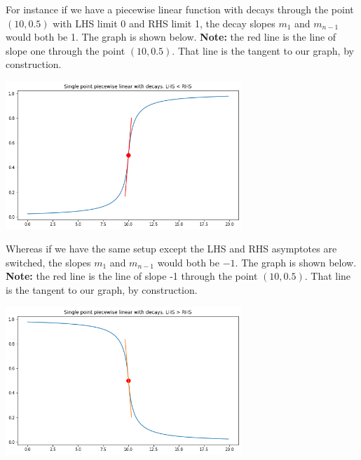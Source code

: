 \documentclass[10pt]{article}
\begin{document}
For instance if we have a piecewise linear function with decays 
through the point $(10,0.5)$ with LHS limit 0 and RHS limit 1, the decay slopes
$m_1$ and $m_{n-1}$ would both be 1.  The graph is shown below. 
\textbf{Note:} the red line is the line of slope one through the point $(10,0.5)$.
That line is the tangent to our graph, by construction. 
\begin{center}
	\includegraphics[width=3.5in]{graph4}
\end{center}

Whereas if we have the same setup except the LHS and RHS asymptotes are switched, the
slopes $m_1$ and $m_{n-1}$ would both be $-1$.  The graph is shown below. 
\textbf{Note:} the red line is the line of slope -1 through the point $(10,0.5)$.
That line is the tangent to our graph, by construction.

\begin{center}
	\includegraphics[width=3.5in]{graph5}
\end{center}
%
%
\end{document}
